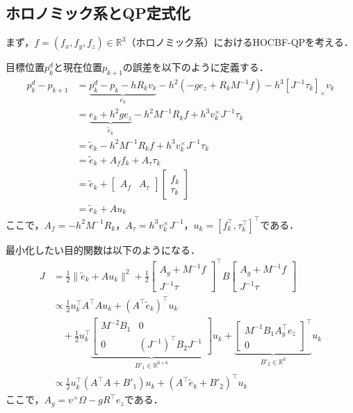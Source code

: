 \subsection{ホロノミック系とQP定式化}

まず，$f = (f_x, f_y, f_z) \in \mathbb{R}^3$（ホロノミック系）におけるHOCBF-QPを考える．

目標位置$p^d_k$と現在位置$p_{k+1}$の誤差を以下のように定義する．
\begin{equation}
\begin{aligned}
p^d_{k} - p_{k+1} &= \underbrace{p^d_{k} - p_k - h R_k v_k}_{e_k} - h^2 (-g e_z + R_k M^{-1} f) - h^3 [J^{-1} \tau_k]_\times v_k \\
&= \underbrace{e_k + h^2 g e_z}_{\tilde{e}_k} - h^2 M^{-1} R_k f + h^3 v_k^\times J^{-1} \tau_k \\
&= \tilde{e}_k - h^2 M^{-1} R_k f + h^3 v_k^\times J^{-1} \tau_k \\
&= \tilde{e}_k + A_f f_k + A_\tau \tau_k \\
&= \tilde{e}_k + \begin{bmatrix} A_f & A_\tau \end{bmatrix} \begin{bmatrix} f_k \\ \tau_k \end{bmatrix} \\
&= \tilde{e}_k + A u_k
\label{eq:position_error}
\end{aligned}
\end{equation}
ここで，$A_f = -h^2 M^{-1} R_k$，$A_\tau = h^3 v_k^\times J^{-1}$，$u_k = [f_k^\top, \tau_k^\top]^\top$である．

最小化したい目的関数は以下のようになる．
\begin{equation}
\begin{aligned}
J &= \frac{1}{2} \|\tilde{e}_k + A u_k\|^2 + \frac{1}{2} \begin{bmatrix} A_g + M^{-1} f \\ J^{-1} \tau \end{bmatrix}^\top B \begin{bmatrix} A_g + M^{-1} f \\ J^{-1} \tau \end{bmatrix} \\
&\propto \frac{1}{2} u_k^\top A^\top A u_k + (A^\top \tilde{e}_k)^\top u_k \\
&\quad + \frac{1}{2} u_k^\top \underbrace{\begin{bmatrix} M^{-2} B_1 & 0 \\ 0 & (J^{-1})^\top B_2 J^{-1} \end{bmatrix}}_{B'_1 \in \mathbb{R}^{6 \times 6}} u_k + \underbrace{\begin{bmatrix} M^{-1} B_1 A_g^\top e_z \\ 0 \end{bmatrix}^\top}_{B'_2 \in \mathbb{R}^{6}} u_k \\
&\propto \frac{1}{2} u_k^\top (A^\top A + B'_1) u_k + (A^\top \tilde{e}_k + B'_2)^\top u_k
\label{eq:objective_function}
\end{aligned}
\end{equation}
ここで，$A_g = v^\times \Omega - g R^\top e_z$である．


